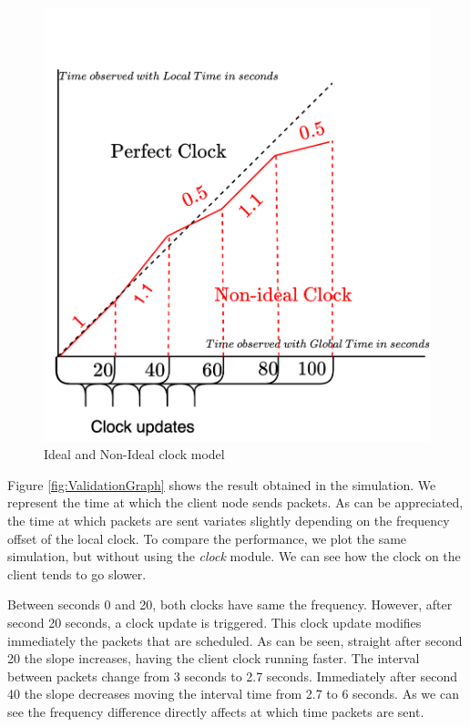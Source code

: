 \documentclass[times, twoside, watermark]{zHenriquesLab-StyleBioRxiv}
\begin{document}
\begin{figure}[h]
    \centering
    \includegraphics[width=0.8\linewidth]{Figures/ClockPatternValidation.png}
    \caption{Ideal and Non-Ideal clock model }
    \label{fig:NonIdealClock}
\end{figure}

Figure \ref{fig:ValidationGraph} shows the result obtained in the simulation. We represent the time at which the client node sends packets. As can be appreciated, the time at which packets are sent variates slightly depending on the frequency offset of the local clock. To compare the performance, we plot the same simulation, but without using the \textit{clock} module. We can see how the clock on the client tends to go slower.   

Between seconds 0 and 20, both clocks have same the frequency. However, after second 20 seconds, a clock update is triggered. This clock update modifies immediately the packets that are scheduled. As can be seen, straight after second 20 the slope increases, having the client clock running faster. The interval between packets change from 3 seconds to 2.7 seconds. Immediately after second 40 the slope decreases moving the interval time from 2.7 to 6 seconds. As we can see the frequency difference directly affects at which time packets are sent.
\end{document}
